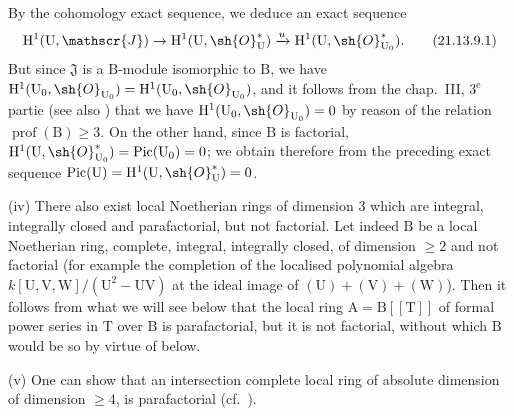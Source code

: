 \begin{env}[21.13.9]
By the cohomology exact sequence, we deduce an exact sequence
\[
\label{IV.21.13.9.1}
  \mathrm{H}^1(\mathrm{U},\mathscr{J})\to\mathrm{H}^1(\mathrm{U},\sh{O}_{\mathrm{U}}^*)\xrightarrow{u}\mathrm{H}^1(\mathrm{U},\sh{O}_{\mathrm{U}_0}^*).
  \tag{21.13.9.1}
\]
But since $\mathfrak{J}$ is a $\mathrm{B}$-module isomorphic to $\mathrm{B}$, we have $\mathrm{H}^1(\mathrm{U}_0,\sh{O}_{\mathrm{U}_0})=\mathrm{H}^1(\mathrm{U}_0,\sh{O}_{\mathrm{U}_0})$, and it follows from the chap.~III, $3^{\text{e}}$ partie (see also \cite[III, Exemple~III-1]{IV-41}) that we have
$\mathrm{H}^1(\mathrm{U}_0,\sh{O}_{\mathrm{U}_0})=0$ by reason of the relation $\operatorname{prof}(\mathrm{B})\geq 3$.
On the other hand, since $\mathrm{B}$ is factorial, $\mathrm{H}^1(\mathrm{U},\sh{O}_{\mathrm{U}_0}^*)=\operatorname{Pic}(\mathrm{U}_0)=0$; we obtain therefore from the preceding exact sequence $\operatorname{Pic}(\mathrm{U})=\mathrm{H}^1(\mathrm{U},\sh{O}_{\mathrm{U}}^*)=0$.

(iv) There also exist local Noetherian rings of dimension $3$ which are integral, integrally closed and parafactorial, but not factorial.
Let indeed $\mathrm{B}$ be a local Noetherian ring, complete, integral, integrally closed, of dimension $\geq 2$ and not factorial (for example the completion of the localised polynomial algebra $k[\mathrm{U},\mathrm{V},\mathrm{W}]/(\mathrm{U}^2-\mathrm{U}\mathrm{V})$ at the ideal image of $(\mathrm{U})+(\mathrm{V})+(\mathrm{W})$).
Then it follows from what we will see below  that the local ring $\mathrm{A}=\mathrm{B}[[\mathrm{T}]]$ of formal power series in $\mathrm{T}$ over $\mathrm{B}$ is parafactorial, but it is not factorial, without which $\mathrm{B}$ would be so by virtue of  below.

(v) One can show that an intersection complete local ring of absolute dimension  of dimension $\geq 4$, is parafactorial (cf.\ \cite[XI, $3.13$~(i)]{IV-41}).


\end{env}
